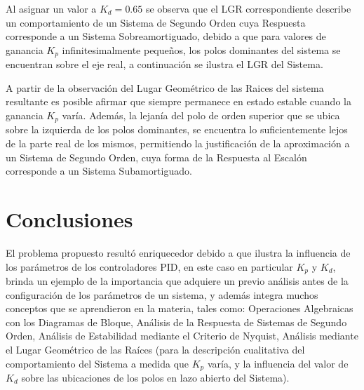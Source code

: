 \documentclass[12pt,letterpaper]{article}
\begin{document}
Al asignar un valor a $K_{d}=0.65$ se observa que el LGR correspondiente describe un comportamiento de un Sistema de Segundo Orden cuya Respuesta corresponde a un Sistema Sobreamortiguado, debido a que para valores de ganancia $K_{p}$ infinitesimalmente pequeños, los polos dominantes del sistema se encuentran sobre el eje real, a continuación se ilustra el LGR del Sistema.

\begin{figure}[H]
\centering
{}
\end{figure}

A partir de la observación del Lugar Geométrico de las Raices del sistema resultante es posible afirmar que siempre permanece en estado estable cuando la ganancia $K_{p}$ varía. Además, la lejanía del polo de orden superior que se ubica sobre la izquierda de los polos dominantes, se encuentra lo suficientemente lejos de la parte real de los mismos, permitiendo la justificación de la aproximación a un Sistema de Segundo Orden, cuya forma de la Respuesta al Escalón corresponde a un Sistema Subamortiguado.

\section{Conclusiones}
El problema propuesto resultó enriquecedor debido a que ilustra la influencia de los parámetros de los controladores PID, en este caso en particular $K_{p}$ y $K_{d}$, brinda un ejemplo de la importancia que adquiere un previo análisis antes de la configuración de los parámetros de un sistema, y además integra muchos conceptos que se aprendieron en la materia, tales como: Operaciones Algebraicas con los Diagramas de Bloque, Análisis de la Respuesta de Sistemas de Segundo Orden, Análisis de Estabilidad mediante el Criterio de Nyquist, Análisis mediante el Lugar Geométrico de las Raíces (para la descripción cualitativa del comportamiento del Sistema a medida que $K_{p}$ varía, y la influencia del valor de $K_{d}$ sobre las ubicaciones de los polos en lazo abierto del Sistema). 
\end{document}
